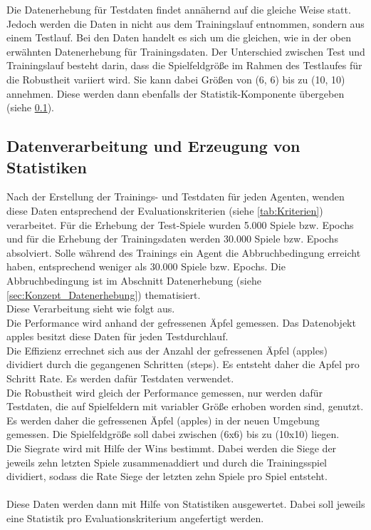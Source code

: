 Die Datenerhebung für Testdaten findet annähernd auf die gleiche Weise statt. Jedoch werden die Daten in nicht aus dem Trainingslauf entnommen, sondern aus einem Testlauf. Bei den Daten handelt es sich um die gleichen, wie in der oben erwähnten Datenerhebung für Trainingsdaten. Der Unterschied zwischen Test und Trainingslauf besteht darin, dass die Spielfeldgröße im Rahmen des Testlaufes für die Robustheit variiert wird. Sie kann dabei Größen von (6, 6) bis zu (10, 10) annehmen.
Diese werden dann ebenfalls der Statistik-Komponente übergeben (siehe \ref{sec:Konzept_Datenverarbeitung}).

\subsection{Datenverarbeitung und Erzeugung von Statistiken} \label{sec:Konzept_Datenverarbeitung}
Nach der Erstellung der Trainings- und Testdaten für jeden Agenten, wenden diese Daten entsprechend der Evaluationskriterien (siehe \ref{tab:Kriterien}) verarbeitet. Für die Erhebung der Test-Spiele wurden 5.000 Spiele bzw. Epochs und für die Erhebung der Trainingsdaten werden 30.000 Spiele bzw. Epochs absolviert. Solle während des Trainings ein Agent die Abbruchbedingung erreicht haben, entsprechend weniger als 30.000 Spiele bzw. Epochs. Die Abbruchbedingung ist im Abschnitt Datenerhebung (siehe \ref{sec:Konzept_Datenerhebung}) thematisiert.\\
Diese Verarbeitung sieht wie folgt aus.\\
Die Performance wird anhand der gefressenen Äpfel gemessen. Das Datenobjekt apples besitzt diese Daten für jeden Testdurchlauf.\\
Die Effizienz errechnet sich aus der Anzahl der gefressenen Äpfel (apples) dividiert durch die gegangenen Schritten (steps). Es entsteht daher die Apfel pro Schritt Rate. Es werden dafür Testdaten verwendet.\\
Die Robustheit wird gleich der Performance gemessen, nur werden dafür Testdaten, die auf Spielfeldern mit variabler Größe erhoben worden sind, genutzt. 
Es werden daher die gefressenen Äpfel (apples) in der neuen Umgebung gemessen. Die Spielfeldgröße soll dabei zwischen (6x6) bis zu (10x10) liegen.\\
Die Siegrate wird mit Hilfe der Wins bestimmt. Dabei werden die Siege der jeweils zehn letzten Spiele zusammenaddiert und durch die Trainingsspiel dividiert, sodass die Rate Siege der letzten zehn Spiele pro Spiel entsteht.\\
\\Diese Daten werden dann mit Hilfe von Statistiken ausgewertet. Dabei soll jeweils eine Statistik pro Evaluationskriterium angefertigt werden. 
